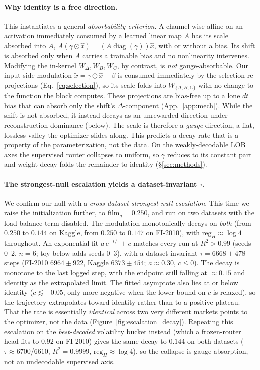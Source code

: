 \documentclass{article}
\DeclareMathOperator{\diagop}{diag}
\newcommand{\diag}{\diagop}
\begin{document}
\paragraph{Why identity is a free direction.}
This instantiates a general \emph{absorbability criterion}. A channel-wise affine on
an activation immediately consumed by a learned linear map $A$ has its scale
absorbed into $A$, $A(\gamma\odot\hat x)=(A\diag(\gamma))\hat x$, with or without a
bias. Its shift is absorbed only when $A$ carries a trainable bias and no
nonlinearity intervenes. Modifying the in-kernel $W_\Delta,W_B,W_C$, by contrast,
is \emph{not} gauge-absorbable. Our input-side modulation
$\tilde{x}=\gamma\odot\hat{x}+\beta$ is consumed immediately by the selection
re-projections (Eq.~\eqref{eq:selection}), so its scale folds into
$W_{\{\Delta,B,C\}}$ with no change to the function the block computes. These
projections are bias-free up to a lone $dt$ bias that can absorb only the shift's
$\Delta$-component (App.~\ref{app:mech}). While the shift is not absorbed, it instead decays as an unrewarded direction under reconstruction
dominance (below). The scale is
therefore a \emph{gauge} direction, a flat, lossless valley
the optimizer slides along. This predicts a decay rate that is a property of the
parameterization, not the data. On the weakly-decodable LOB axes the supervised
router collapses to uniform, so $\gamma$ reduces to its constant part and weight
decay folds the remainder to identity (\S\ref{sec:methods}).

\paragraph{The strongest-null escalation yields a dataset-invariant $\tau$.}
We confirm our null with a \emph{cross-dataset strongest-null escalation}.
This time we raise the initialization further, to $\mathrm{film}_g=0.250$, and run
on two datasets with the load-balance term disabled. The modulation
monotonically decays on \emph{both} (from $0.250$ to $0.144$ on Kaggle, from
$0.250$ to $0.147$ on FI-2010), with $\mathrm{reg}_H\approx\log 4$ throughout. An exponential fit
$a\,e^{-t/\tau}+c$ matches every run at $R^2>0.99$ (seeds 0--2, $n{=}6$; toy below
adds seeds 0--3), with a dataset-invariant $\tau=6668\pm478$ steps (FI-2010
$6964\pm922$, Kaggle $6373\pm454$; $a\approx0.30$, $c\le0$). The decay is monotone to the last logged step, with the
endpoint still falling at $\approx0.15$ and identity as the extrapolated limit.
The fitted asymptote also lies at or below identity ($c\lesssim-0.05$, only more
negative when the lower bound on $c$ is relaxed), so the trajectory extrapolates
toward identity rather than to a positive plateau. That the rate is essentially
\emph{identical} across two very different markets points to the optimizer, not
the data (Figure~\ref{fig:escalation_decay}). Repeating this escalation on the
\emph{best-decoded} volatility bucket instead (which a frozen-router head fits to
$0.92$ on FI-2010) gives the same decay to $0.144$ on both datasets ($\tau\approx6700$/$6610$,
$R^2=0.9999$, $\mathrm{reg}_H\approx\log 4$), so the collapse is gauge absorption,
not an undecodable supervised axis.
\end{document}
